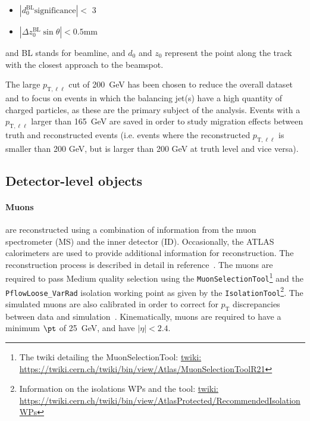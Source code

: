 \begin{itemize}
    \item $|d_0^{\text{BL}}\text{significance}| < $ 3
    \item $|\Delta z_0^{\text{BL}}\sin\theta| < 0.5 $mm
\end{itemize}

and BL stands for beamline, and $d_0$ and $z_0$ represent the point along the track with the closest approach to the beamspot.

The large $p_{\text{T},\ell\ell}$ cut of 200~GeV has been chosen to reduce the overall dataset and to focus on events in which the balancing jet(s) have a high quantity of charged particles, as these are the primary subject of the analysis.
Events with a $p_{\text{T},\ell\ell}$ larger than 165~GeV are saved in order to study migration effects between truth and reconstructed events (i.e. events where the reconstructed $p_{\text{T},\ell\ell}$
is smaller than 200 GeV, but is larger than 200 GeV at truth level and vice versa).

\subsection{Detector-level objects}

\paragraph{Muons} are reconstructed using a combination of information from the muon spectrometer (MS) and the inner detector (ID). Occasionally, the ATLAS calorimeters are used to provide additional information for reconstruction. The reconstruction process is described in detail in reference~\cite{Aad:2016jkr}.
The muons are required to pass Medium quality selection using the \texttt{MuonSelectionTool}\footnote{The twiki detailing the MuonSelectionTool: \url{twiki: https://twiki.cern.ch/twiki/bin/view/Atlas/MuonSelectionToolR21}} and the \texttt{PflowLoose\_VarRad} isolation working point as given by
the \texttt{IsolationTool}\footnote{Information on the isolations WPs and the tool: \url{twiki: https://twiki.cern.ch/twiki/bin/view/AtlasProtected/RecommendedIsolationWPs}}. The simulated muons are also calibrated in order to correct for $p_\text{T}$ discrepancies between data and simulation~\cite{Aad:2016jkr}.
Kinematically, muons are required to have a minimum $\pt$ of 25~GeV, and have $|\eta|<2.4$.

